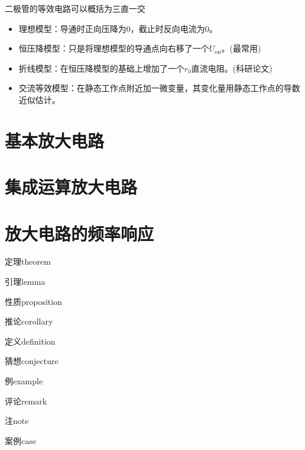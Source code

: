 \documentclass[cn,pad,11pt,geye]{elegantnote}
\begin{document}
\begin{corollary}[二极管的等效电路]
	二极管的等效电路可以概括为三直一交
	\begin{itemize}
		\item 理想模型：导通时正向压降为0，截止时反向电流为0。
		\item 恒压降模型：只是将理想模型的导通点向右移了一个$U_{\mathrm{on}}$。(最常用)
		\item 折线模型：在恒压降模型的基础上增加了一个$r_0$直流电阻。(科研论文)
		\item 交流等效模型：在静态工作点附近加一微变量，其变化量用静态工作点的导数近似估计。
	\end{itemize}
\end{corollary}


\section{基本放大电路}
\section{集成运算放大电路}
\section{放大电路的频率响应}
\label{disizhang}

\begin{theorem}
	定理theorem
\end{theorem}
\begin{lemma}
	引理lemma
\end{lemma}
\begin{proposition}
	性质proposition
\end{proposition}
\begin{corollary}
	推论corollary
\end{corollary}
\begin{definition}
	定义definition
\end{definition}
\begin{conjecture}
	猜想conjecture
\end{conjecture}
\begin{example}
	例example
\end{example}
\begin{remark}
	评论remark
\end{remark}
\begin{note}
	注note
\end{note}
\begin{case}
	案例case
\end{case}
\end{document}

